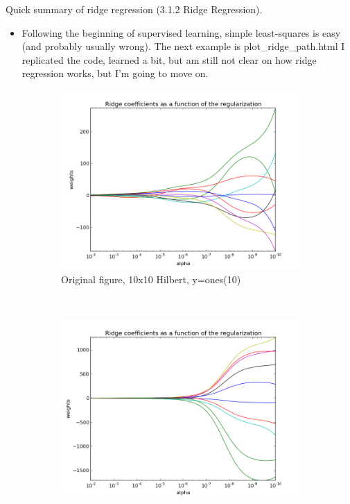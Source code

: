 \documentclass{article}
\begin{document}
	Quick summary of ridge regression (3.1.2 Ridge Regression).

	\begin{itemize}
		\item Following the beginning of supervised learning, simple least-squares is easy (and probably usually wrong).  The next example is plot\_ridge\_path.html I replicated the code, learned a bit, but am still not clear on how ridge regression works, but I'm going to move on.
	\end{itemize}

    \begin{figure}
            \centering
            \begin{subfigure}[b]{0.3\textwidth}
                    \centering
                    \includegraphics[width=\textwidth]{fig_original.png}
                    \caption{Original figure, 10x10 Hilbert, y=ones(10)}
                    \label{fig:orig}
            \end{subfigure}%
            ~ %
            \begin{subfigure}[b]{0.3\textwidth}
                    \centering
                    \includegraphics[width=\textwidth]{fig_yrand.png}

\end{subfigure}
\end{figure}
\end{document}
